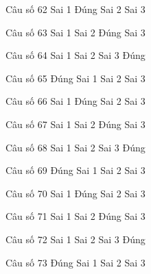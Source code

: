 \begin{ex}
Câu số 62
\choice
{Sai 1}
{\True Đúng}
{Sai 2}
{Sai 3}
\end{ex}

\begin{ex}
Câu số 63
\choice
{Sai 1}
{Sai 2}
{\True Đúng}
{Sai 3}
\end{ex}

\begin{ex}
Câu số 64
\choice
{Sai 1}
{Sai 2}
{Sai 3}
{\True Đúng}
\end{ex}
\begin{ex}
Câu số 65
\choice
{\True Đúng}
{Sai 1}
{Sai 2}
{Sai 3}
\end{ex}

\begin{ex}
Câu số 66
\choice
{Sai 1}
{\True Đúng}
{Sai 2}
{Sai 3}
\end{ex}

\begin{ex}
Câu số 67
\choice
{Sai 1}
{Sai 2}
{\True Đúng}
{Sai 3}
\end{ex}

\begin{ex}
Câu số 68
\choice
{Sai 1}
{Sai 2}
{Sai 3}
{\True Đúng}
\end{ex}
\begin{ex}
Câu số 69
\choice
{\True Đúng}
{Sai 1}
{Sai 2}
{Sai 3}
\end{ex}

\begin{ex}
Câu số 70
\choice
{Sai 1}
{\True Đúng}
{Sai 2}
{Sai 3}
\end{ex}

\begin{ex}
Câu số 71
\choice
{Sai 1}
{Sai 2}
{\True Đúng}
{Sai 3}
\end{ex}

\begin{ex}
Câu số 72
\choice
{Sai 1}
{Sai 2}
{Sai 3}
{\True Đúng}
\end{ex}
\begin{ex}
Câu số 73
\choice
{\True Đúng}
{Sai 1}
{Sai 2}
{Sai 3}
\end{ex}

